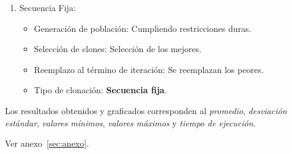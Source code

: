 \begin{enumerate}
	\item Secuencia Fija:

		\begin{itemize}
			\item Generación de población: Cumpliendo restricciones duras.
			\item Selección de clones: Selección de los mejores.
			\item Reemplazo al término de iteración:  Se reemplazan los peores.
			\item Tipo de clonación: \textbf{Secuencia fija}.
		\end{itemize}

\end{enumerate}

Los resultados obtenidos y graficados corresponden al \emph{promedio}, \emph{desviación estándar},
\emph{valores mínimos}, \emph{valores máximos} y \emph{tiempo de ejecución}.


Ver anexo~\ref{sec:anexo}.
